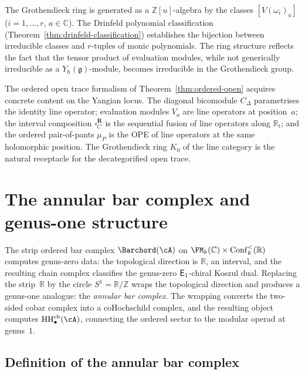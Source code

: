 \begin{remark}
The Grothendieck ring is generated as a
$\mathbb{Z}[u]$-algebra by the classes
$[V(\omega_i)_a]$ ($i=1,\dots,r$, $a\in\mathbb{C}$).
The Drinfeld polynomial classification
(Theorem~\ref{thm:drinfeld-classification}) establishes
the bijection between irreducible classes and
$r$-tuples of monic polynomials. The ring structure
reflects the fact that the tensor product of evaluation
modules, while not generically irreducible as a
$Y_\hbar(\mathfrak{g})$-module, becomes irreducible in the
Grothendieck group.
\end{remark}

\begin{remark}
\label{rem:eval-open-trace}
The ordered open trace formalism of
Theorem~\ref{thm:ordered-open} acquires concrete content
on the Yangian locus. The diagonal bicomodule $C_\Delta$
parametrises the identity line operator; evaluation modules
$V_a$ are line operators at position~$a$; the interval
composition $\square_C^{\mathbf{R}}$ is the sequential
fusion of line operators along $\mathbb{R}_t$; and the
ordered pair-of-pants $\mu_P$ is the OPE of line operators
at the same holomorphic position. The Grothendieck ring
$K_0$ of the line category is the natural receptacle for
the decategorified open trace.
\end{remark}


\section{The annular bar complex and genus-one structure}
\label{sec:annular-bar}

The strip ordered bar complex
$\Barchord(\cA)$
on $\FM_k(\mathbb{C})\times\mathrm{Conf}_k^{<}(\mathbb{R})$ computes
genus-zero data: the topological direction is $\mathbb{R}$, an interval,
and the resulting chain complex classifies the genus-zero
$\mathsf{E}_1$-chiral Koszul dual.
Replacing the strip~$\mathbb{R}$ by the circle
$S^1=\mathbb{R}/\mathbb{Z}$ wraps the topological direction
and produces a genus-one analogue: the \emph{annular bar complex}.
The wrapping converts the two-sided cobar complex into a
coHochschild complex, and the resulting object computes
$\HH^{\mathrm{ch}}_\bullet(\cA)$, connecting the ordered sector to the
modular operad at genus~$1$.

\subsection{Definition of the annular bar complex}

